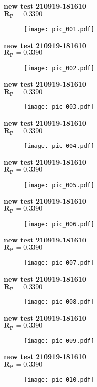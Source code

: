 \documentclass[12pt,a4paper]{article}
\begin{document}
\pagestyle{empty}

\newcommand{\bigtitle}{
\begin{center}
\large
\textbf{new test 210919-181610                                                          }\\
$\mathbf{R_{P} = 0.3390}$
\end{center}
}

\newpage
\bigtitle
\begin{figure}[H]
\texttt{[image: pic\_001.pdf]}
\end{figure}

\newpage
\bigtitle
\begin{figure}[H]
\texttt{[image: pic\_002.pdf]}
\end{figure}

\newpage
\bigtitle
\begin{figure}[H]
\texttt{[image: pic\_003.pdf]}
\end{figure}

\newpage
\bigtitle
\begin{figure}[H]
\texttt{[image: pic\_004.pdf]}
\end{figure}

\newpage
\bigtitle
\begin{figure}[H]
\texttt{[image: pic\_005.pdf]}
\end{figure}

\newpage
\bigtitle
\begin{figure}[H]
\texttt{[image: pic\_006.pdf]}
\end{figure}

\newpage
\bigtitle
\begin{figure}[H]
\texttt{[image: pic\_007.pdf]}
\end{figure}

\newpage
\bigtitle
\begin{figure}[H]
\texttt{[image: pic\_008.pdf]}
\end{figure}

\newpage
\bigtitle
\begin{figure}[H]
\texttt{[image: pic\_009.pdf]}
\end{figure}

\newpage
\bigtitle
\begin{figure}[H]
\texttt{[image: pic\_010.pdf]}
\end{figure}
\end{document}
